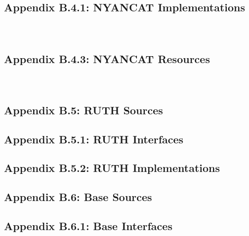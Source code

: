 \documentclass{article}[11pt]
\begin{document}
\subsection{Appendix B.4.1: NYANCAT Implementations}
\inputminted[frame=single,label=GraphvizReport.groovy]{python}{../naomi/src/main/groovy/org/radigan/naomi/nyancat/impl/GraphvizReport.groovy}
\inputminted[frame=single,label=OctaveReport.groovy]{python}{../naomi/src/main/groovy/org/radigan/naomi/nyancat/impl/OctaveReport.groovy}
\inputminted[frame=single,label=WumpusReport.groovy]{python}{../naomi/src/main/groovy/org/radigan/naomi/nyancat/impl/WumpusReport.groovy}
\subsection{Appendix B.4.3: NYANCAT Resources}
\inputminted[frame=single,label=graphviz.dot]{bash}{../naomi/src/main/resources/org/radigan/naomi/data/reports/graphviz.dot}
\inputminted[frame=single,label=octave.m]{matlab}{../naomi/src/main/resources/org/radigan/naomi/data/reports/octave.m}
\inputminted[frame=single,label=wumpus.html]{html}{../naomi/src/main/resources/org/radigan/naomi/data/reports/wumpus.html}
\subsection{Appendix B.5: RUTH Sources}
\subsection{Appendix B.5.1: RUTH Interfaces}
\subsection{Appendix B.5.2: RUTH Implementations}
\subsection{Appendix B.6: Base Sources}
\subsection{Appendix B.6.1: Base Interfaces}
\inputminted[frame=single,label=Tool.java]{java}{../naomi/src/main/java/org/radigan/system/tools/Tool.java}
\inputminted[frame=single,label=Matrix.java]{java}{../naomi/src/main/java/org/radigan/system/utilities/Matrix.java}
\end{document}
